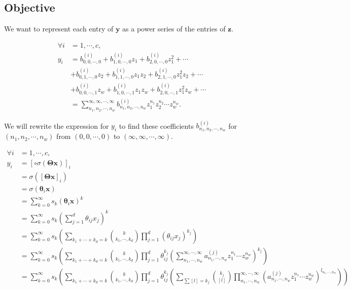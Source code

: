 \subsection{Objective}
We want to represent each entry of $\mathbf{y}$ as a power series of the entries of $\mathbf{z}$.

\begin{align*}
    \forall i &= 1, \cdots, c, \\ y_i
    &= b^{(i)}_{0,0,\cdots,0} + b^{(i)}_{1,0,\cdots,0} z_1 + b^{(i)}_{2,0,\cdots,0} z_1^2 + \cdots \\
    &+ b^{(i)}_{0,1,\cdots,0} z_2 + b^{(i)}_{1,1,\cdots,0} z_1 z_2 + b^{(i)}_{2,1,\cdots,0} z_1^2 z_2 + \cdots \\
    &+ b^{(i)}_{0,0,\cdots,1} z_w + b^{(i)}_{1,0,\cdots,1} z_1 z_w + b^{(i)}_{2,0,\cdots,1} z_1^2 z_w + \cdots \\
    &= \sum_{n_1,n_2,\cdots,n_w}^{\infty,\infty,\cdots,\infty} b^{(i)}_{n_1,n_2,\cdots,n_w} z_1^{n_1} z_2^{n_2} \cdots z_w^{n_w}.
\end{align*}

We will rewrite the expression for $y_i$ to find these coefficients $b^{(i)}_{n_1, n_2, \cdots, n_w}$ for $(n_1, n_2, \cdots, n_w)$ from $(0, 0, \cdots, 0)$ to $(\infty, \infty, \cdots, \infty)$.

\begin{align*}
    \forall i &= 1, \cdots, c, \\ y_i
    &= \left[\circ\sigma(\mathbf{\Theta} \mathbf{x})\right]_i \\
    &= \sigma(\left[\mathbf{\Theta} \mathbf{x}\right]_i) \\
    &= \sigma(\mathbf{\theta}_i \mathbf{x}) \\
    &= \sum_{k=0}^{\infty} s_k (\mathbf{\theta}_i \mathbf{x})^k \\
    &= \sum_{k=0}^{\infty} s_k \left(\sum_{j=1}^{d} \theta_{ij} x_{j}\right)^k \\
    &= \sum_{k=0}^{\infty} s_k \left(\sum_{k_1 + \cdots + k_d = k} \binom{k}{k_1, \cdots, k_d} \prod_{j=1}^{d} (\theta_{ij} x_j)^{k_j} \right) \\
    &= \sum_{k=0}^{\infty} s_k \left(\sum_{k_1 + \cdots + k_d = k} \binom{k}{k_1, \cdots, k_d} \prod_{j=1}^{d}\theta_{ij}^{k_j} \left(\sum_{n_1, \cdots, n_w}^{\infty,
    \cdots, \infty} a^{(j)}_{n_1,\cdots,n_w} z_1^{n_1}  \cdots z_w^{n_w} \right)^{k_j}\right) \\
    &= \sum_{k=0}^{\infty} s_k \left(\sum_{k_1 + \cdots + k_d = k} \binom{k}{k_1, \cdots, k_d} \prod_{j=1}^{d} \theta_{ij}^{k_j} \left(\sum_{\sum [l] = k_j} \binom{k_j}{[l]} \prod_{n_1, \cdots, n_w}^{\infty, \cdots, \infty} (a^{(j)}_{n_1, \cdots, n_w} z_1^{n_1} \cdots z_w^{n_w})^{l_{n_1, \cdots, n_w}} \right)\right)
\end{align*}

